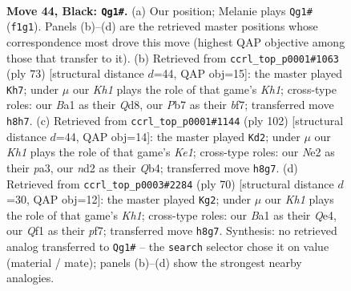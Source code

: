 \documentclass[11pt]{article}
\begin{document}
\clearpage

\begin{figure}[p]\centering
\begin{subfigure}{0.46\textwidth}\centering
\resizebox{\linewidth}{!}{%
\newchessgame
\chessboard[
  setfen={7k/1p3p2/6p1/p7/P6p/7P/3Nn1PK/b4q2 b - - 2 44},
  showmover=false,
  pgfstyle=straightmove, color=movearrow, markmove={f1-g1}
]}
\caption{}
\end{subfigure}\hfill
\begin{subfigure}{0.46\textwidth}\centering
\resizebox{\linewidth}{!}{%
\newchessgame
\chessboard[
  setfen={3q3k/5B2/2p5/p3pP2/p3PbQ1/8/1PP5/7K b - - 2 37},
  showmover=false,
  pgfstyle=straightmove, color=movearrow, markmove={h8-h7}
]}
\caption{}
\end{subfigure}
\\[4pt]
\begin{subfigure}{0.46\textwidth}\centering
\resizebox{\linewidth}{!}{%
\newchessgame
\chessboard[
  setfen={8/8/2k1p3/1n6/1Q3Pp1/pp4P1/2p3P1/4K3 w - - 2 52},
  showmover=false,
  pgfstyle=straightmove, color=movearrow, markmove={e1-d2}
]}
\caption{}
\end{subfigure}\hfill
\begin{subfigure}{0.46\textwidth}\centering
\resizebox{\linewidth}{!}{%
\newchessgame
\chessboard[
  setfen={6k1/1pp2p2/6Np/P7/4Q2P/P5P1/5n2/7K w - - 0 36},
  showmover=false,
  pgfstyle=straightmove, color=movearrow, markmove={h1-g2}
]}
\caption{}
\end{subfigure}
\caption{\textbf{Move 44, Black: \texttt{Qg1\#}.} (a) Our position; Melanie plays \texttt{Qg1\#} (\texttt{f1g1}). Panels (b)--(d) are the retrieved master positions whose correspondence most drove this move (highest QAP objective among those that transfer to it). (b) Retrieved from \texttt{ccrl\_top\_p0001\#1063} (ply 73) [structural distance $d$=44, QAP obj=15]: the master played \texttt{Kh7}; under $\mu$ our \emph{Kh1} plays the role of that game's \emph{Kh1}; cross-type roles: our \emph{B}a1 as their \emph{Q}d8, our \emph{P}b7 as their \emph{b}f7; transferred move \texttt{h8h7}. (c) Retrieved from \texttt{ccrl\_top\_p0001\#1144} (ply 102) [structural distance $d$=44, QAP obj=14]: the master played \texttt{Kd2}; under $\mu$ our \emph{Kh1} plays the role of that game's \emph{Ke1}; cross-type roles: our \emph{N}e2 as their \emph{p}a3, our \emph{n}d2 as their \emph{Q}b4; transferred move \texttt{h8g7}. (d) Retrieved from \texttt{ccrl\_top\_p0003\#2284} (ply 70) [structural distance $d$=30, QAP obj=12]: the master played \texttt{Kg2}; under $\mu$ our \emph{Kh1} plays the role of that game's \emph{Kh1}; cross-type roles: our \emph{B}a1 as their \emph{Q}e4, our \emph{Q}f1 as their \emph{p}f7; transferred move \texttt{h8g7}. Synthesis: no retrieved analog transferred to \texttt{Qg1\#} -- the \texttt{search} selector chose it on value (material / mate); panels (b)--(d) show the strongest nearby analogies.}
\label{fig:thought-m87}
\end{figure}
\end{document}
